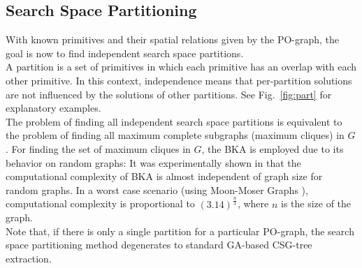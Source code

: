 \subsection{Search Space Partitioning}
With known primitives and their spatial relations given by the \ac{PO}-graph, the goal is now to find independent search space partitions. 
\\
A partition is a set of primitives in which each primitive has an overlap with each other primitive.
In this context, independence means that per-partition solutions are not influenced by the solutions of other partitions.
See Fig.~\ref{fig:part} for explanatory examples. 
\\
The problem of finding all independent search space partitions is equivalent to the problem of finding all maximum complete subgraphs (maximum cliques) in $G$.
For finding the set of maximum cliques in $G$, the \ac{BKA}\cite{bron1973cliques} is employed due to its behavior on random graphs:
It was experimentally shown in \cite{bron1973cliques} that the computational complexity of \ac{BKA} is almost independent of graph size for random graphs.
In a worst case scenario (using Moon-Moser Graphs \cite{moon1965cliques}), computational complexity is proportional to $(3.14)^{\frac{n}{3}}$, where $n$ is the size of the graph.
\\
Note that, if there is only a single partition for a particular \ac{PO}-graph, the search space partitioning method degenerates to standard \ac{GA}-based \ac{CSG}-tree extraction. 
